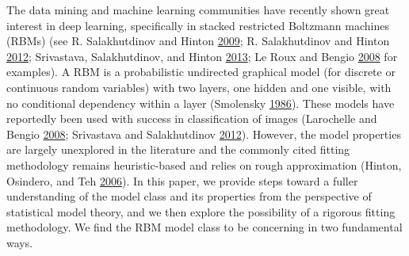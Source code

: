\documentclass[12pt]{article}
\theoremstyle{definition}
\begin{document}
The data mining and machine learning communities have recently shown
great interest in deep learning, specifically in stacked restricted
Boltzmann machines (RBMs) (see R. Salakhutdinov and Hinton
\protect\hyperlink{ref-salakhutdinov2009deep}{2009}; R. Salakhutdinov
and Hinton \protect\hyperlink{ref-salakhutdinov2012efficient}{2012};
Srivastava, Salakhutdinov, and Hinton
\protect\hyperlink{ref-srivastava2013modeling}{2013}; Le Roux and Bengio
\protect\hyperlink{ref-le2008representational}{2008} for examples). A
RBM is a probabilistic undirected graphical model (for discrete or
continuous random variables) with two layers, one hidden and one
visible, with no conditional dependency within a layer (Smolensky
\protect\hyperlink{ref-smolensky1986information}{1986}). These models
have reportedly been used with success in classification of images
(Larochelle and Bengio
\protect\hyperlink{ref-larochelle2008classification}{2008}; Srivastava
and Salakhutdinov
\protect\hyperlink{ref-srivastava2012multimodal}{2012}). However, the
model properties are largely unexplored in the literature and the
commonly cited fitting methodology remains heuristic-based and relies on
rough approximation (Hinton, Osindero, and Teh
\protect\hyperlink{ref-hinton2006fast}{2006}). In this paper, we provide
steps toward a fuller understanding of the model class and its
properties from the perspective of statistical model theory, and we then
explore the possibility of a rigorous fitting methodology. We find the
RBM model class to be concerning in two fundamental ways.
\end{document}
